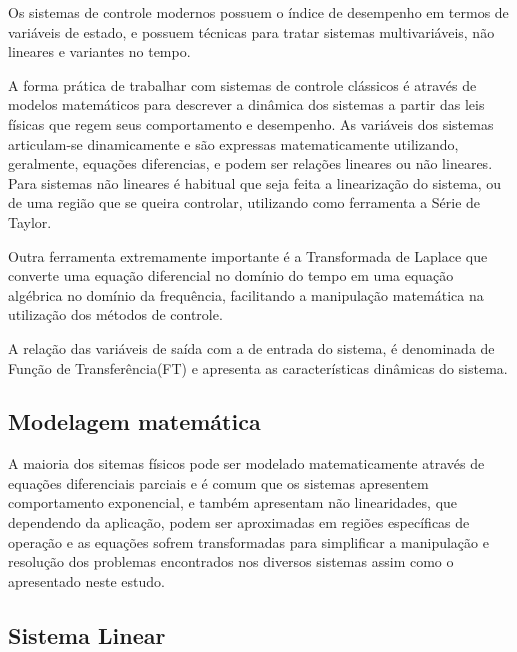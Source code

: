 Os sistemas de controle modernos possuem o índice de 
desempenho em termos de variáveis de estado, 
e possuem técnicas para tratar sistemas multivariáveis, 
não lineares e variantes no tempo.

A forma prática de trabalhar com sistemas de controle clássicos é 
através de modelos matemáticos para descrever a dinâmica dos sistemas 
a partir das leis físicas que regem seus comportamento e desempenho.
As variáveis dos sistemas articulam-se dinamicamente e são 
expressas matematicamente utilizando, geralmente, 
equações diferencias, e podem ser relações lineares ou não lineares. 
Para sistemas não lineares é habitual que seja feita a 
linearização do sistema, ou de uma região que se queira controlar, 
utilizando como ferramenta a Série de Taylor. 

Outra ferramenta extremamente importante é a Transformada de Laplace que 
converte uma equação diferencial no domínio do tempo em uma 
equação algébrica no domínio da frequência, 
facilitando a manipulação matemática na utilização dos métodos de controle. 

A relação das variáveis de saída com a de entrada do sistema, 
é denominada de Função de Transferência(FT) 
%
e apresenta as características dinâmicas do sistema.



\subsection{Modelagem matemática}

A maioria dos sitemas físicos pode ser modelado matematicamente através de 
equações diferenciais parciais e é comum que os sistemas apresentem 
comportamento exponencial, e também apresentam não linearidades, 
que dependendo da aplicação, podem ser aproximadas em 
regiões específicas de operação e as equações sofrem 
transformadas para simplificar a manipulação e resolução dos 
problemas encontrados nos diversos sistemas assim como o 
apresentado neste estudo.


\subsection{Sistema Linear}

